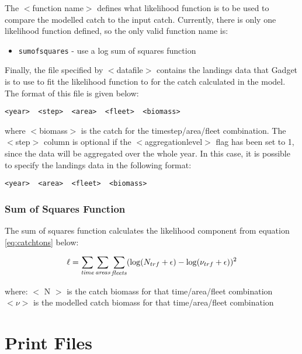 \documentclass[]{book}
\providecommand{\tightlist}{%
  \setlength{\itemsep}{0pt}\setlength{\parskip}{0pt}}
\begin{document}
The \(<\)function name\(>\) defines what likelihood function is to be used
to compare the modelled catch to the input catch. Currently, there is
only one likelihood function defined, so the only valid function name
is:

\begin{itemize}
\tightlist
\item
  \texttt{sumofsquares} - use a log sum of squares function
\end{itemize}

Finally, the file specified by \(<\)datafile\(>\) contains the landings data
that Gadget is to use to fit the likelihood function to for the catch
calculated in the model. The format of this file is given below:

\begin{verbatim}
<year>  <step>  <area>  <fleet>  <biomass>
\end{verbatim}

where \(<\)biomass\(>\) is the catch for the timestep/area/fleet
combination. The \(<\)step\(>\) column is optional if the
\(<\)aggregationlevel\(>\) flag has been set to 1, since the data will be
aggregated over the whole year. In this case, it is possible to specify
the landings data in the following format:

\begin{verbatim}
<year>  <area>  <fleet>  <biomass>
\end{verbatim}

\hypertarget{sum-of-squares-function-3}{%
\subsection{Sum of Squares Function}\label{sum-of-squares-function-3}}

The sum of squares function calculates the likelihood component from
equation \eqref{eq:catchtons} below:

\begin{equation}
\label{eq:catchtons}
\ell = \sum_{\it time}\sum_{\it areas}\sum_{\it fleets} (\log(N_{trf} + \epsilon) - \log(\nu_{trf} + \epsilon))^2\end{equation}

where: \(<\) N \(>\) is the catch biomass for that time/area/fleet
combination \(<\nu>\) is the modelled catch biomass for that
time/area/fleet combination

\hypertarget{chap:print}{%
\chapter{Print Files}\label{chap:print}}
\end{document}
